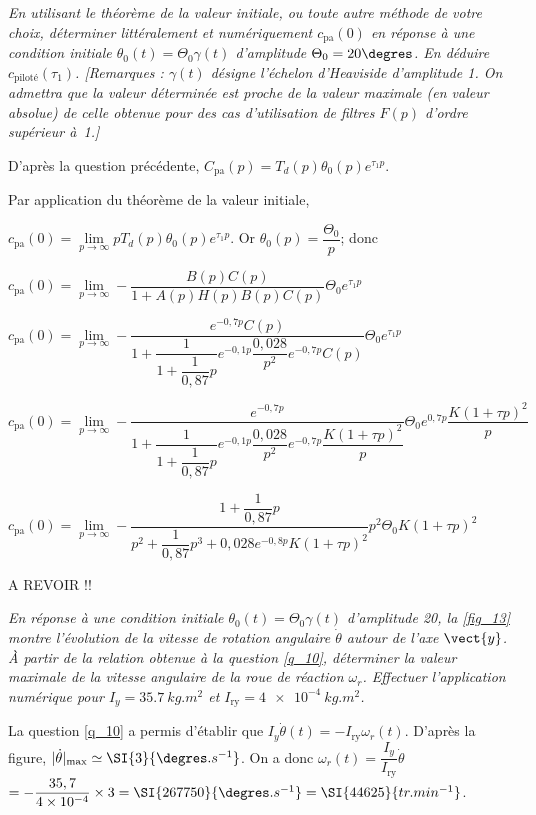 \question{\label{q_25}}\textit{En utilisant le théorème de la valeur initiale,
ou toute autre méthode de votre choix, déterminer littéralement
et numériquement $c_{\text{pa}}(0)$ en réponse à une condition initiale 
$\theta_0(t)=\Theta_0 \gamma(t)$ d'amplitude $\Theta_0 = 20\degres$. En
déduire $c_{\text{piloté}}(\tau_1)$. 
[Remarques : $\gamma(t)$ désigne l’échelon d’Heaviside d’amplitude 1. On admettra que la valeur déterminée est proche de la 
valeur maximale (en valeur absolue) de celle obtenue pour des cas d’utilisation
de filtres $F(p)$ d'ordre supérieur à~1.]}
\ifprof
\begin{corrige}

D'après la question précédente,  $C_{\text{pa}}(p) = T_d(p) \theta_0(p)  e^{\tau_1 p}$.

Par application du théorème de la valeur initiale, 

$c_{\text{pa}}(0) = \lim\limits_{p \to \infty} p T_d(p) \theta_0(p)  e^{\tau_1 p} $. Or $\theta_0(p) = \dfrac{\Theta_0}{p}$; donc 

$c_{\text{pa}}(0) = \lim\limits_{p \to \infty}   -\dfrac{ B(p) C(p)}{ 1+ A(p) H(p) B(p) C(p)}  \Theta_0  e^{\tau_1 p}  $

$c_{\text{pa}}(0) = \lim\limits_{p \to \infty}   -\dfrac{e^{-0,7p} C(p)}{ 1+ \dfrac{1}{1+\dfrac{1}{0,87}p}e^{-0,1 p}  \dfrac{0,028}{p^2} e^{-0,7p} C(p)}  \Theta_0  e^{\tau_1 p}  $

$c_{\text{pa}}(0) = \lim\limits_{p \to \infty}   -\dfrac{e^{-0,7p}}{ 1+ \dfrac{1}{1+\dfrac{1}{0,87}p}e^{-0,1 p}  \dfrac{0,028}{p^2} e^{-0,7p} \dfrac{K(1+\tau p)^2}{p}}  \Theta_0  e^{0,7 p}   \dfrac{K(1+\tau p)^2}{p}$

$c_{\text{pa}}(0) = \lim\limits_{p \to \infty}   -\dfrac{ 1+\dfrac{1}{0,87}p}{p^2+\dfrac{1}{0,87}p^3+  0,028 e^{-0,8p} K(1+\tau p)^2}   p^2\Theta_0  K(1+\tau p)^2  $


A REVOIR !!



\end{corrige}
\else
\fi

\question{\label{q_26}}\textit{En réponse à une condition initiale  $\theta_0(t)=\Theta_0 \gamma(t)$ d’amplitude 20\degres, 
la \autoref{fig_13} montre l’évolution de la vitesse de rotation angulaire $\dot{\theta}$
autour de l’axe $\vect{y}$. À partir de la relation obtenue à la question \ref{q_10}, déterminer
la valeur maximale de la vitesse angulaire de la roue de réaction $\omega_r$.
Effectuer l’application numérique pour
$I_y = \SI{35,7}{kg.m^2}$ et $I_{\text{ry}}=\SI{4e-4}{kg.m^2}$.}
\ifprof
\begin{corrige}
La question \ref{q_10} a permis d'établir que $I_y \dot{\theta}(t)=-I_{\text{ry}}\omega_r(t)$. D'après la figure, $| \dot{\theta}|_{\text{max}} \simeq \SI{3}{\degres.s^{-1}}$. 
On a donc $\omega_r(t) =  \dfrac{I_y}{I_{\text{ry}}} \dot{\theta}$ $=- \dfrac{35,7}{4\times 10^{-4}} \times 3 = \SI{267750}{\degres.s^{-1}} = \SI{44625}{tr.min^{-1}}$.
\end{corrige}
\else
\fi

